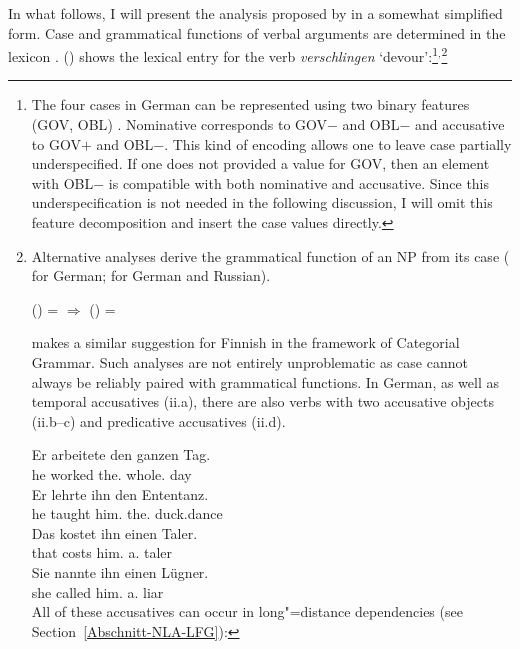 {In what follows, I will present the analysis proposed by  \citet[Section~2.1.3]{Berman96a-u} in a
somewhat simplified form. Case and grammatical functions of verbal arguments are determined
in the lexicon \citep[]{Berman96a-u}. () shows the lexical entry for the verb \emph{verschlingen} `devour':\footnote{%
The four cases in German can be represented using two binary features ({\small GOV}, {\small OBL}) \citep[]{Berman96a-u}. Nominative corresponds to {\small GOV}$-$ and
  {\small OBL}$-$ and accusative to {\small GOV}$+$ and {\small OBL}$-$. This kind of encoding allows one to leave case partially underspecified. If one does not provided a value
  for {\small GOV}, then an element with {\small OBL}$-$  is compatible with both nominative and accusative. Since this underspecification is not needed in the following discussion,
  I will omit this feature decomposition and insert the case values directly.
}$^,$\footnote{%
	Alternative analyses derive the grammatical function of an NP from its case (\citealp[]{Berman2003a} for German; \citealp[, ]{Bresnan2001a} for German and Russian).

\ea
\label{Kasus-Implikation-Berman}
\upshape      (\downsp \case) = \mdacc{} $\Rightarrow$ (\upsp \lfgobj) = \down{}
\z

\noindent
  \citet[Section~2.1]{Karttunen89a-u} makes a similar suggestion for Finnish in the framework of Categorial Grammar\indexcxg.
  Such analyses are not entirely unproblematic as case cannot always be reliably paired with grammatical functions. In German, as well as temporal
  accusatives (ii.a), there are also verbs with two accusative objects (ii.b--c) and predicative accusatives (ii.d).

\eal
\ex 
\gll Er arbeitete den ganzen Tag.\\
	 he worked the.\acc{} whole.\acc{} day\\
\ex 
\gll Er lehrte ihn den Ententanz.\\
	 he taught him.\acc{} the.\acc{} duck.dance\\
\ex 
\gll Das kostet ihn einen Taler.\\
	 that costs him.\acc{} a.\acc{} taler\\
\ex 
\gll Sie nannte ihn einen Lügner.\\
	 she called him.\acc{} a.\acc{} liar\\
\zl
All of these accusatives can occur in long"=distance dependencies (see Section~\ref{Abschnitt-NLA-LFG}):

}}
